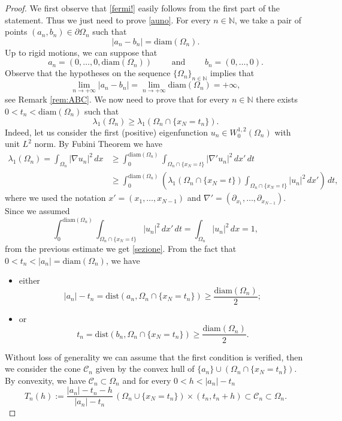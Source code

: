 \documentclass{amsart}
\theoremstyle{definition}
\numberwithin{equation}{section}
\begin{document}
\begin{proof}
We first observe that \eqref{fermi!} easily follows from the first part of the statement. Thus we just need to prove \eqref{auno}. For every $n\in\mathbb{N}$, we take a pair of points $(a_n,b_n)\in\partial\Omega_n$ such that
\[
|a_n-b_n|=\mathrm{diam}(\Omega_n).
\]
Up to rigid motions, we can suppose that 
\[
a_n=(0,\dots,0,\mathrm{diam}(\Omega_n))\qquad \mbox{ and }\qquad b_n=(0,\dots,0).
\]
Observe that the hypotheses on the sequence $\{\Omega_n\}_{n\in\mathbb{N}}$ implies that
\[
\lim_{n\to+\infty}|a_n-b_n|=\lim_{n\to+\infty}\mathrm{diam}(\Omega_n)=+\infty,
\]
see Remark \ref{rem:ABC}.
We now need to prove that for every $n\in\mathbb{N}$ there exists $0<t_n<\mathrm{diam}(\Omega_n)$ such that
\begin{equation}
\label{sezione}
\lambda_1(\Omega_n)\ge \lambda_1(\Omega_n\cap\{x_N=t_n\}).
\end{equation}
Indeed, let us consider the first (positive) eigenfunction $u_{n}\in W^{1,2}_0(\Omega_n)$ with unit $L^2$ norm. By Fubini Theorem we have
\[
\begin{split}
\lambda_1(\Omega_n)=\int_{\Omega_n} |\nabla u_{n}|^2\,dx&\ge\int_0^{\mathrm{diam}(\Omega_n)} \int_{\Omega_n\cap \{x_N=t\}} |\nabla' u_{n}|^2\,dx'\,dt\\
&\ge \int_0^{\mathrm{diam}(\Omega_n)} \left(\lambda_1(\Omega_n\cap\{x_N=t\})\int_{\Omega_n\cap \{x_N=t\}} |u_{n}|^2\,dx'\right)\,dt,
\end{split}
\]
where we used the notation $x'=(x_1,\dots,x_{N-1})$ and $\nabla'=(\partial_{x_1},\dots,\partial_{x_{N-1}})$. Since we assumed
\[
\int_0^{\mathrm{diam}(\Omega_n)} \int_{\Omega_n\cap \{x_N=t\}} |u_{n}|^2\,dx'\,dt=\int_{\Omega_n} |u_{n}|^2\,dx=1,
\] 
from the previous estimate we get \eqref{sezione}. From the fact that $0<t_n<|a_n|=\mathrm{diam}(\Omega_n)$, we have
\begin{itemize}
\item either
\[
|a_n|-t_n=\mathrm{dist}(a_n,\Omega_n\cap\{x_N=t_n\})\ge \frac{\mathrm{diam}(\Omega_n)}{2};
\]
\item or 
\[
t_n=\mathrm{dist}(b_n,\Omega_n\cap\{x_N=t_n\})\ge \frac{\mathrm{diam}(\Omega_n)}{2}.
\]
\end{itemize}
Without loss of generality we can assume that the first condition is verified, then we consider the cone $\mathcal{C}_n$ given by the convex hull of $\{a_n\}\cup(\Omega_n\cap\{x_N=t_n\})$. By convexity, we have $\mathcal{C}_n\subset\Omega_n$ and for every $0<h<|a_n|-t_n$
\[
T_n(h):=\frac{|a_n|-t_n-h}{|a_n|-t_n}\,(\Omega_n\cup\{x_N=t_n\})\times(t_n,t_n+h)\subset\mathcal{C}_n\subset\Omega_n.
\]
\end{proof}
\end{document}
